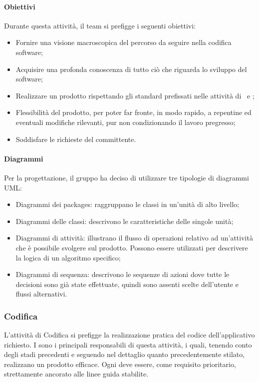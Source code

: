		\paragraph{Obiettivi}
		Durante questa attività, il team si prefigge i seguenti obiettivi:
		\begin{itemize}
			\item Fornire una visione macroscopica del percorso da seguire nella codifica software;
			\item Acquisire una profonda conoscenza di tutto ciò che riguarda lo sviluppo del software;
			\item Realizzare un prodotto rispettando gli standard prefissati nelle attività di \SdF\ e \AdR;
			\item Flessibilità del prodotto, per poter far fronte, in modo rapido, a repentine ed eventuali modifiche rilevanti, pur non condizionando il lavoro pregresso;
			\item Soddisfare le richieste del committente.
		\end{itemize}
	\paragraph{Diagrammi}
	Per la progettazione, il gruppo ha deciso di utilizzare tre tipologie di diagrammi UML:
		\begin{itemize}
			\item Diagrammi dei packages: raggruppano le classi in un'unità di alto livello;
			\item Diagrammi delle classi: descrivono le caratteristiche delle singole unità;
			\item Diagrammi di attività: illustrano il flusso di operazioni relativo ad un'attività che è possibile svolgere sul prodotto. Possono essere utilizzati per descrivere la logica di un algoritmo specifico;
			\item Diagrammi di sequenza: descrivono le sequenze di azioni dove tutte le decisioni sono già state effettuate, quindi sono assenti scelte dell'utente e flussi alternativi.
		\end{itemize}
	
	\subsubsection{Codifica}
	L'attività di Codifica si prefigge la realizzazione pratica del codice dell'applicativo richiesto. I \textit{\Progrs} sono i principali responsabili di questa attività, i quali, tenendo conto degli stadi precedenti e seguendo nel dettaglio quanto precedentemente stilato, realizzano un prodotto efficace. Ogni \textit{\Progr} deve essere, come requisito prioritario, strettamente ancorato alle linee guida stabilite.
	
